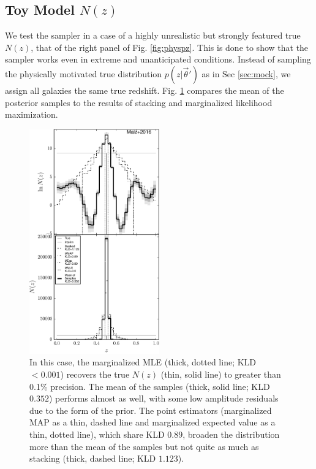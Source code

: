 \documentclass[preprint]{aastex}
\begin{document}
\subsection{Toy Model $N(z)$}
\label{sec:fake}

We test the sampler in a case of a highly unrealistic but strongly featured 
true $N(z)$, that of the right panel of Fig. \ref{fig:physpz}.  This is done to 
show that the sampler works even in extreme and unanticipated conditions.  
Instead of sampling the physically motivated true distribution 
$p(z|\vec{\theta}')$ as in Sec \ref{sec:mock}, we assign all galaxies the same 
true redshift.  Fig. \ref{fig:toy-comp} compares the mean of the posterior 
samples to the results of stacking and marginalized likelihood maximization.    


\begin{figure}
\includegraphics[width=0.5\textwidth]{figs/delt/comps.pdf}
\caption{In this case, the marginalized MLE (thick, dotted line; KLD $<0.001$) 
recovers the true $N(z)$ (thin, solid line) to greater than 0.1\% precision.  
The mean of the samples (thick, solid line; KLD $0.352$) performs almost as 
well, with some low amplitude residuals due to the form of the prior.  The 
point estimators (marginalized MAP as a thin, dashed line and marginalized 
expected value as a thin, dotted line), which share KLD $0.89$, broaden the 
distribution more than the mean of the samples but not quite as much as 
stacking (thick, dashed line; KLD $1.123$).}
\label{fig:toy-comp}
\end{figure}
\end{document}
